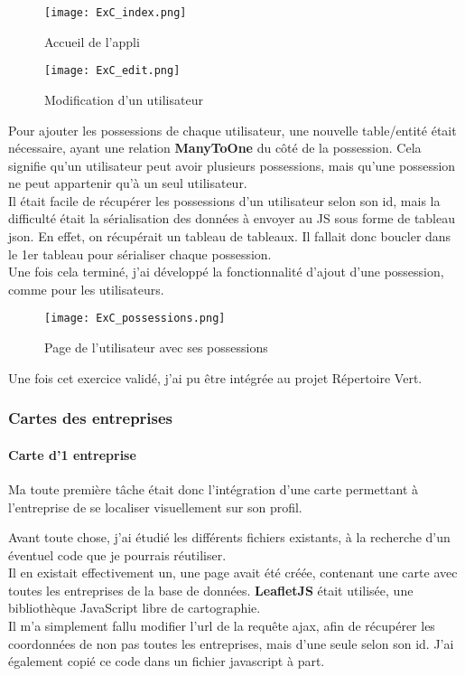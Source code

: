 \begin{figure}[H]
    \centering
    \texttt{[image: ExC\_index.png]}
    \caption{Accueil de l'appli}
\end{figure}

\begin{figure}[H]
    \centering
    \texttt{[image: ExC\_edit.png]}
    \caption{Modification d'un utilisateur}
\end{figure}



Pour ajouter les possessions de chaque utilisateur, une nouvelle table/entité était nécessaire, ayant une relation \textbf{ManyToOne} du côté de la possession. 
Cela signifie qu'un utilisateur peut avoir plusieurs possessions, mais qu'une possession ne peut appartenir qu'à un seul utilisateur. \\
Il était facile de récupérer les possessions d'un utilisateur selon son id, mais la difficulté était la sérialisation des données à envoyer au JS sous forme de tableau json.
En effet, on récupérait un tableau de tableaux. Il fallait donc boucler dans le 1er tableau pour sérialiser chaque possession.\\
Une fois cela terminé, j'ai développé la fonctionnalité d'ajout d'une possession, comme pour les utilisateurs.

\begin{figure}[H]
    \centering
    \texttt{[image: ExC\_possessions.png]}
    \caption{Page de l'utilisateur avec ses possessions}
\end{figure}

Une fois cet exercice validé, j'ai pu être intégrée au projet Répertoire Vert.


\subsubsection{Cartes des entreprises}

\label{carte}

\paragraph{Carte d'1 entreprise}
Ma toute première tâche était donc l'intégration d'une carte permettant à l'entreprise de se localiser visuellement sur son profil.

Avant toute chose, j'ai étudié les différents fichiers existants, à la recherche d'un éventuel code que je pourrais réutiliser.
\\Il en existait effectivement un, une page avait été créée, contenant une carte avec toutes les entreprises de la base de données. \textbf{LeafletJS} était utilisée, une bibliothèque JavaScript libre de cartographie.
\\Il m'a simplement fallu modifier l'url de la requête ajax, afin de récupérer les coordonnées de non pas toutes les entreprises, mais d'une seule selon son id. J'ai également copié ce code dans un fichier javascript à part.

